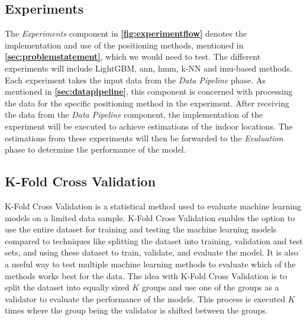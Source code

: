 \subsection{Experiments}
The \textit{Experiments} component in \textbf{\autoref{fig:experimentflow}} denotes the implementation and use of the positioning methods, mentioned in \textbf{\autoref{sec:problemstatement}}, which we would need to test. The different experiments will include LightGBM, \gls{ann}, \gls{hmm}, k-NN and \gls{imu}-based methods. Each experiment takes the input data from the \textit{Data Pipeline} phase. As mentioned in \textbf{\autoref{sec:datapipeline}}, this component is concerned with processing the data for the specific positioning method in the experiment. After receiving the data from the \textit{Data Pipeline} component, the implementation of the experiment will be executed to achieve estimations of the indoor locations. The estimations from these experiments will then be forwarded to the \textit{Evaluation} phase to determine the performance of the model.
%

\subsection{K-Fold Cross Validation}
K-Fold Cross Validation is a statistical method used to evaluate machine learning models on a limited data sample. K-Fold Cross Validation enables the option to use the entire dataset for training and testing the machine learning models compared to techniques like splitting the dataset into training, validation and test sets, and using these dataset to train, validate, and evaluate the model. It is also a useful way to test multiple machine learning methods to evaluate which of the methods works best for the data. 
The idea with K-Fold Cross Validation is to split the dataset into equally sized $K$ groups and use one of the groups as a validator to evaluate the performance of the models. This process is executed $K$ times where the group being the validator is shifted between the groups.\cite{kfold}

